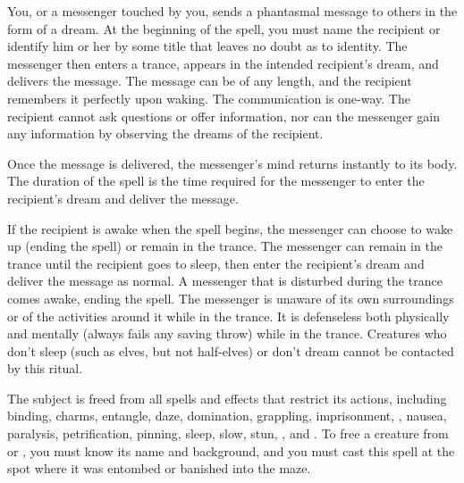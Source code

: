 \spelleffect You, or a messenger touched by you, sends a phantasmal message to others in the form of a dream. At the beginning of the spell, you must name the recipient or identify him or her by some title that leaves no doubt as to identity. The messenger then enters a trance, appears in the intended recipient's dream, and delivers the message. The message can be of any length, and the recipient remembers it perfectly upon waking. The communication is one-way. The recipient cannot ask questions or offer information, nor can the messenger gain any information by observing the dreams of the recipient.
\par Once the message is delivered, the messenger's mind returns instantly to its body. The duration of the spell is the time required for the messenger to enter the recipient's dream and deliver the message.
\par If the recipient is awake when the spell begins, the messenger can choose to wake up (ending the spell) or remain in the trance. The messenger can remain in the trance until the recipient goes to sleep, then enter the recipient's dream and deliver the message as normal. A messenger that is disturbed during the trance comes awake, ending the spell. The messenger is unaware of its own surroundings or of the activities around it while in the trance. It is defenseless both physically and mentally (always fails any saving throw) while in the trance.
\spellnotes Creatures who don't sleep (such as elves, but not half-elves) or don't dream cannot be contacted by this ritual. 

\spelleffect The subject is freed from all spells and effects that restrict its actions, including binding, charms, entangle, daze, domination, grappling, imprisonment, , nausea, paralysis, petrification, pinning, sleep, slow, stun, , and . To free a creature from  or , you must know its name and background, and you must cast this spell at the spot where it was entombed or banished into the maze.


